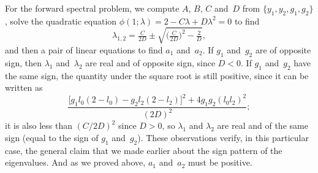 \documentclass[10pt,a4paper]{article} \pdfoutput=1 
\begin{document}
\begin{example}
  For the forward spectral problem, we compute $A$, $B$, $C$ and~$D$ from
  $\{ y_1, y_2, g_1, g_2 \}$,
  solve the quadratic equation
  $\phi(1;\lambda) = 2 - C \lambda + D \lambda^2 = 0$
  to find
  \begin{equation*}
    \lambda_{1,2} = \tfrac{C}{2D} \pm \sqrt{\bigl( \tfrac{C}{2D} \bigr)^2 - \tfrac{2}{D}}
    ,
  \end{equation*}
  and then a pair of linear equations to find $a_1$ and~$a_2$.
  If $g_1$ and~$g_2$ are of opposite sign, then $\lambda_1$ and~$\lambda_2$
  are real and of opposite sign, since $D<0$.
  If $g_1$ and~$g_2$ have the same sign, the quantity under the square root is still positive,
  since it can be written as
  \begin{equation*}
    \frac{\bigl[ g_1 l_0 (2-l_0) - g_2 l_2 (2-l_2) \bigr]^2 + 4 g_1 g_2 (l_0 l_2)^2}{(2D)^{2}}
    ;
  \end{equation*}
  it is also less than $(C/2D)^2$ since $D>0$,
  so $\lambda_1$ and $\lambda_2$ are real and of the same sign (equal to the sign of $g_1$ and~$g_2$).
  These observations verify, in this particular case,
  the general claim that we made earlier
  about the sign pattern of the eigenvalues.
  And as we proved above, $a_1$ and~$a_2$ must be positive.


\end{example}
\end{document}
